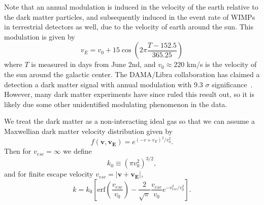 Note that an annual modulation is induced in the velocity of the earth relative to the dark matter particles, and subsequently induced in the event rate of WIMPs in terrestrial detectors as well, due to the velocity of earth around the sun.  This modulation is given by 
\begin{equation}
v_E = v_0 + 15\cos \left(2\pi \frac{T - 152.5}{365.25} \right)
\end{equation}
where $T$ is measured in days from June 2nd, and $v_0 \approx 220$ km/s is the velocity of the sun around the galactic center. The DAMA/Libra collaboration has claimed a detection a dark matter signal with annual modulation with 9.3 $\sigma$ significance~\cite{Bernabei:2013xsa}.  However, many dark matter experiments have since ruled this result out, so it is likely due some other unidentified modulating phenomenon in the data.

We treat the dark matter as a non-interacting ideal gas so that we can assume a Maxwellian dark matter velocity distribution given by
\begin{equation}
f(\mathbf{v},\mathbf{v_E})=e^{(-v+v_{E})^2/v_0^2}.
\end{equation}
Then for $v_{esc}=\infty$ we define
\begin{equation} \label{k-not}
k_0 \equiv (\pi v_0^2)^{3/2},
\end{equation}
and for finite escape velocity $v_{esc}=|\mathbf{v}+\mathbf{v_E}|$,
\begin{equation}
k=k_0 \left[\mbox{erf}(\frac{v_{esc}}{v_0}) - \frac{2}{\sqrt{\pi}} \frac{v_{esc}}{v_0} e^{-v_{esc}^2/v_0^2} \right].
\end{equation}

